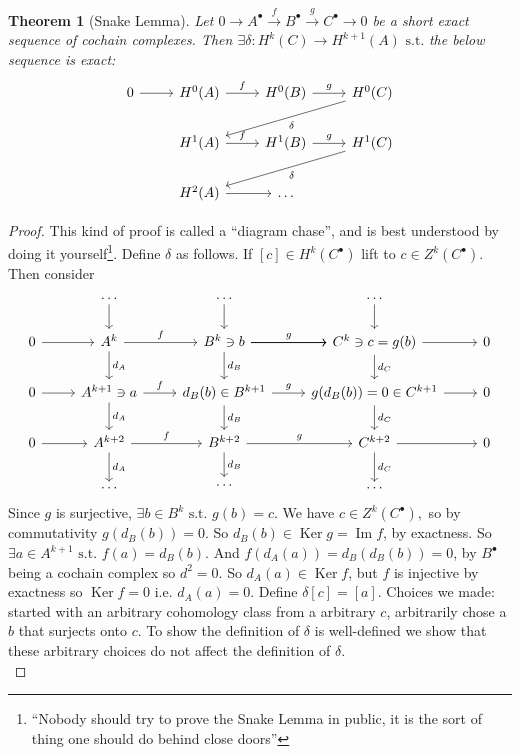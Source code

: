 \documentclass[10pt]{article}
\theoremstyle{plain}
\newtheorem{theorem}{Theorem}[section]
\theoremstyle{definition}
\newcommand{\st}{\text{ s.t. }}
\DeclareMathOperator{\Ker}{Ker}
\DeclareMathOperator{\Ima}{Im}
\newcommand{\funcSES}[5]{0\to {#1}^\bullet \xrightarrow{#2} {#3}^\bullet \xrightarrow{#4} {#5}^\bullet \to 0}
\newcommand{\funcABCSES}{\funcSES{A}{f}{B}{g}{C}}
\begin{document}
\begin{theorem}[Snake Lemma]\label{theorem:snakelemma}
Let $\funcABCSES$ be a short exact sequence of cochain complexes. Then $\exists\delta : H^k(C) \to H^{k+1}(A) \st$the below sequence is exact:$$
\begin{tikzcd}
0 \arrow[r] & H^0(A) \arrow[r, "f"] & H^0(B) \arrow[r, "g"] & H^0(C) \arrow[lld, "\delta"] \\
            & H^1(A) \arrow[r, "f"] & H^1(B) \arrow[r, "g"] & H^1(C) \arrow[lld, "\delta"] \\
            & H^2(A) \arrow[r]      & \dots                 &                             
\end{tikzcd}$$
\end{theorem}
\begin{proof}
This kind of proof is called a ``diagram chase'', and is best understood by doing it yourself\footnote{``Nobody should try to prove the Snake Lemma in public, it is the sort of thing one should do behind close doors''}. Define $\delta$ as follows. If $[c] \in H^k(C^\bullet)$ lift to $c\in Z^k(C^\bullet)$. Then consider 
$$\begin{tikzcd}
            & \dots \arrow[d]                              & \dots \arrow[d]                                                          & \dots \arrow[d]                                   &   \\
0 \arrow[r] & A^k \arrow[r, "f"] \arrow[d, "d_A"]          & B^k\ni b \arrow[r, "g"] \arrow[d, "d_B" ] \arrow[r] \arrow[r] & C^k\ni c = g(b) \arrow[r] \arrow[d, "d_C"]        & 0 \\
0 \arrow[r] & A^{k+1}\ni a \arrow[r, "f"] \arrow[d, "d_A"] & d_B(b)\in B^{k+1} \arrow[r, "g"] \arrow[d, "d_B"]                        & g(d_B(b))=0\in C^{k+1} \arrow[r] \arrow[d, "d_C"] & 0 \\
0 \arrow[r] & A^{k+2} \arrow[r, "f"] \arrow[d, "d_A"]      & B^{k+2} \arrow[r, "g"] \arrow[d, "d_B"]                                  & C^{k+2} \arrow[r] \arrow[d, "d_C"]                & 0 \\
            & \dots                                        & \cdots                                                                   & \dots                                             &  
\end{tikzcd}$$
Since $g$ is surjective, $\exists b \in B^k \st g(b) = c.$ We have $c\in Z^k(C^\bullet),$ so by commutativity $g(d_B(b)) = 0$. So $d_B(b) \in \Ker g = \Ima f$, by exactness. So $\exists a \in A^{k+1} \st f(a) = d_B(b)$. And $f(d_A(a)) = d_B(d_B(b)) = 0$, by $B^\bullet$ being a cochain complex so $d^2 =0$. So $d_A(a) \in \Ker f$, but $f$ is injective by exactness so $\Ker f = 0$ i.e. $d_A(a) = 0$. Define $\delta [c] = [a]$. Choices we made: started with an arbitrary cohomology class from a arbitrary $c$, arbitrarily chose a $b$ that surjects onto $c$. To show the definition of $\delta$ is well-defined we show that these arbitrary choices do not affect the definition of $\delta$.\\

\end{proof}
\end{document}
